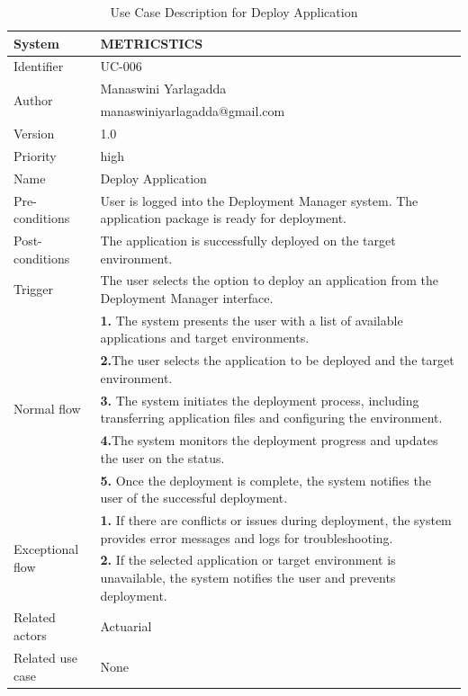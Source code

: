 \begin{table}[htb]
    \centering
    \begin{tabular}{|p{4cm}|p{12cm}|} \hline 
         System &  METRICSTICS\\ \hline 
         
         Identifier & UC-006 \\ \hline 
         
         \multirow{2}{*}{Author} & Manaswini Yarlagadda \\
         &manaswiniyarlagadda@gmail.com \\
           \hline 
           Version & 1.0\\ \hline
         
         Priority &  high\\ \hline 
         
         Name & Deploy Application \\ \hline 
         Pre-conditions & User is logged into the Deployment Manager system.
The application package is ready for deployment. \\ \hline 
         Post-conditions & The application is successfully deployed on the target environment. \\ \hline
         Trigger & The user selects the option to deploy an application from the Deployment Manager interface. \\ \hline
        \multirow{5}{*}{Normal flow} 
        & \textbf{1.} The system presents the user with a list of available applications and target environments. \\ 
        & \textbf{2.}The user selects the application to be deployed and the target environment.\\
 & \textbf{3.}  The system initiates the deployment process, including transferring application files and configuring the environment. \\ 
        & \textbf{4.}The system monitors the deployment progress and updates the user on the status.\\
 & \textbf{5.}  Once the deployment is complete, the system notifies the user of the successful deployment. \\ 
         
        
        \hline
         \multirow{2}{*}{Exceptional flow} 
        & \textbf{1.} If there are conflicts or issues during deployment, the system provides error messages and logs for troubleshooting. \\ 
        & \textbf{2.} If the selected application or target environment is unavailable, the system notifies the user and prevents deployment.\\ \hline 
        Related actors & Actuarial \\ \hline
        Related use case &  None \\ \hline
    \end{tabular}
    \caption{Use Case Description for Deploy Application}
    \label{tab:my_label}
\end{table}
